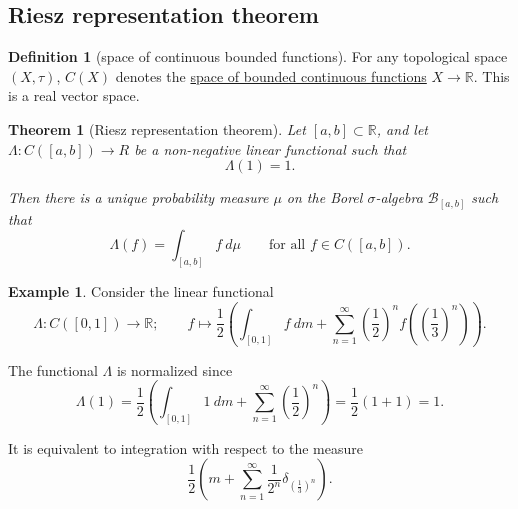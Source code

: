 \documentclass[a4paper]{scrartcl}
\newcommand{\R}{\mathbb{R}}
\newcommand{\defn}[1]{\ul{#1}}
\theoremstyle{definition}
\newtheorem{definition}{Definition}[section]
\newtheorem{example}{Example}[section]
\theoremstyle{plain}
\newtheorem{theorem}{Theorem}[section]
\theoremstyle{remark}
\begin{document}
\subsection{Riesz representation theorem}
\begin{definition}[space of continuous bounded functions]
  \label{def:spaceofboundedlinearfunctions}
  For any topological space $(X, \tau)$, $C(X)$ denotes the \defn{space of bounded continuous functions} $X \to \R$. This is a real vector space.
\end{definition}

\begin{theorem}[Riesz representation theorem]
  \label{thm:rieszrepresentationtheorem}
  Let $[a, b] \subset \R$, and let $\Lambda\colon C([a, b]) \to R$ be a non-negative linear functional such that
  \begin{equation*}
    \Lambda(1) = 1.
  \end{equation*}

  Then there is a unique probability measure $\mu$ on the Borel $\sigma$-algebra $\mathcal{B}_{[a, b]}$ such that
  \begin{equation*}
    \Lambda(f) = \int_{[a, b]} f\ d\mu\qquad\text{for all }f \in C([a, b]).
  \end{equation*}
\end{theorem}

\begin{example}
  Consider the linear functional
  \begin{equation*}
    \Lambda\colon C([0, 1]) \to \R;\qquad f \mapsto \frac{1}{2}\left( \int_{[0, 1]} f\ dm + \sum_{n=1}^{\infty} {\left( \frac{1}{2} \right)}^{n} f\left( {\left( \frac{1}{3} \right)}^{n} \right) \right).
  \end{equation*}

  The functional $\Lambda$ is normalized since
  \begin{equation*}
    \Lambda(1) = \frac{1}{2}\left( \int_{[0, 1]} 1\ dm + \sum_{n=1}^{\infty} {\left( \frac{1}{2} \right)}^{n} \right) = \frac{1}{2}\left( 1 + 1 \right) = 1.
  \end{equation*}

  It is equivalent to integration with respect to the measure
  \begin{equation*}
    \frac{1}{2}\left( m + \sum_{n=1}^{\infty} \frac{1}{2^{n}} \delta_{{\left( \frac{1}{3} \right)}^{n}} \right).
  \end{equation*}
\end{example}
\end{document}
